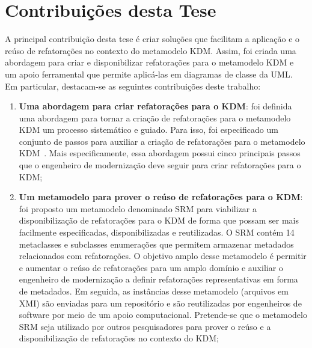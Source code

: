 \section{Contribuições desta Tese}\label{sec:contribuicoes_desta_tese}

A principal contribuição desta tese é criar soluções que facilitam a aplicação e o reúso de refatorações no contexto do metamodelo KDM. Assim, foi criada uma abordagem para criar e disponibilizar refatorações para o metamodelo KDM e um apoio ferramental que permite aplicá-las em diagramas de classe da UML. %
%
Em particular, destacam-se as seguintes contribuições deste trabalho:

\begin{enumerate}

\item \textbf{Uma abordagem para criar refatorações para o KDM}: foi definida uma abordagem para tornar a criação de refatorações para o metamodelo KDM um processo sistemático e guiado. Para isso, foi especificado um conjunto de passos para auxiliar a criação de refatorações para o metamodelo KDM~\cite{durelli_catalogo}. Mais especificamente, essa abordagem possui cinco principais passos que o engenheiro de modernização deve seguir para criar refatorações para o KDM;

\item \textbf{Um metamodelo para prover o reúso de refatorações para o KDM}: foi proposto um metamodelo denominado SRM para viabilizar a disponibilização de refatorações para o KDM de forma que possam ser mais facilmente especificadas, disponibilizadas e reutilizadas. O SRM contém 14 metaclasses e subclasses enumerações que permitem armazenar metadados relacionados com refatorações. O objetivo amplo desse metamodelo é permitir e aumentar o reúso de refatorações para um amplo domínio e auxiliar o engenheiro de modernização a definir refatorações representativas em forma de metadados. Em seguida, as instâncias desse metamodelo (arquivos em XMI) são enviadas para um repositório e são reutilizadas por engenheiros de software por meio de um apoio computacional. Pretende-se que o metamodelo SRM seja utilizado por outros pesquisadores para prover o reúso e a disponibilização de refatorações no contexto do KDM;



\end{enumerate}
